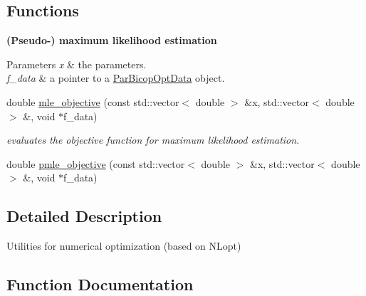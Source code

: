 \subsection*{Functions}
\begin{Indent}{\bf (Pseudo-\/) maximum likelihood estimation}\par
{\em 
\begin{DoxyParams}{Parameters}
{\em x} & the parameters. \\
\hline
{\em f\+\_\+data} & a pointer to a \hyperlink{structtools__optimization_1_1_par_bicop_opt_data}{Par\+Bicop\+Opt\+Data} object. \\
\hline
\end{DoxyParams}
}\begin{DoxyCompactItemize}
\item 
double \hyperlink{namespacetools__optimization_af0ad8465d57bf8b2f414a6fb84cb7daf}{mle\+\_\+objective} (const std\+::vector$<$ double $>$ \&x, std\+::vector$<$ double $>$ \&, void $\ast$f\+\_\+data)\hypertarget{namespacetools__optimization_af0ad8465d57bf8b2f414a6fb84cb7daf}{}\label{namespacetools__optimization_af0ad8465d57bf8b2f414a6fb84cb7daf}

\begin{DoxyCompactList}\small\item\em evaluates the objective function for maximum likelihood estimation. \end{DoxyCompactList}\item 
double \hyperlink{namespacetools__optimization_aa87593437ba7768621ea1f772f11c931}{pmle\+\_\+objective} (const std\+::vector$<$ double $>$ \&x, std\+::vector$<$ double $>$ \&, void $\ast$f\+\_\+data)
\end{DoxyCompactItemize}
\end{Indent}


\subsection{Detailed Description}
Utilities for numerical optimization (based on N\+Lopt) 

\subsection{Function Documentation}
